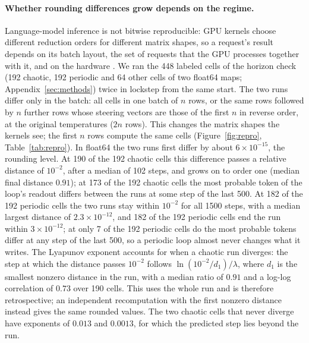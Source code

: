 \documentclass[11pt,letterpaper]{article}
\begin{document}
\paragraph{Whether rounding differences grow depends on the regime.} Language-model inference is not bitwise
reproducible: GPU kernels choose different reduction orders for different matrix shapes, so a request's result depends
on its batch layout, the set of requests that the GPU processes together with it, and on the hardware
\cite{he2025nondeterminism,yuan2025nondeterminism}. We ran the 448 labeled
cells of the horizon check (192 chaotic, 192 periodic and 64 other cells of two float64 maps; Appendix~\ref{sec:methods})
twice in lockstep from the same start. The two runs differ only in the batch: all cells in one batch of $n$ rows, or
the same rows followed by $n$ further rows whose steering vectors are those of the first $n$ in reverse order, at the
original temperatures ($2n$ rows). This changes the matrix shapes the kernels see; the first $n$ rows compute the same
cells (Figure~\ref{fig:repro}, Table~\ref{tab:repro}). In float64 the two runs first differ by about
$6\times10^{-15}$, the rounding level. At 190 of the 192 chaotic cells this difference passes a relative distance of
$10^{-2}$, after a median of 102 steps, and grows on to order one (median final distance $0.91$); at 173 of the 192
chaotic cells the most probable token of the loop's readout differs between the runs at some step of the last 500. At
182 of the 192 periodic cells the two runs stay within $10^{-2}$ for all 1500 steps, with a median largest distance of
$2.3\times10^{-12}$, and 182 of the 192 periodic cells end the run within $3\times10^{-12}$; at only 7 of the 192
periodic cells do the most probable tokens differ at any step of the last 500, so a periodic loop almost never changes
what it writes. The Lyapunov exponent
accounts for when a chaotic run diverges: the step at which the distance passes $10^{-2}$ follows
$\ln(10^{-2}/d_1)/\lambda$, where $d_1$ is the smallest nonzero distance in the run, with a median ratio of $0.91$
and a log-log correlation of $0.73$ over 190 cells. This uses the whole run and is therefore retrospective; an
independent recomputation with the first nonzero distance instead gives the same rounded values. The two chaotic
cells that never diverge have exponents of $0.013$ and $0.0013$, for which the predicted step lies beyond the run.
\end{document}
